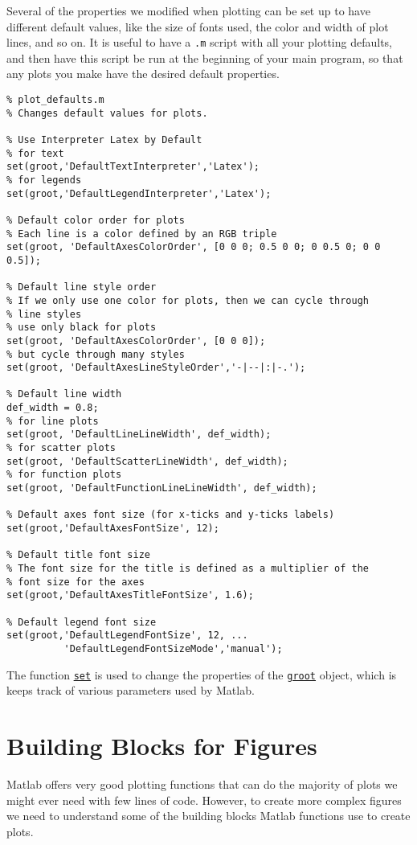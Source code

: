 \documentclass[12pt, a4paper]{article}
\begin{document}
Several of the properties we modified when plotting can be set up to have different default values, like the size of fonts used, the color and width of plot lines, and so on.
It is useful to have a \texttt{.m} script with all your plotting defaults, and then have this script be run at the beginning of your main program, so that any plots you make have the desired default properties.

\lstset{language=matlab,label= ,caption= ,captionpos=b,firstnumber=1,numbers=left,style=Matlab-editor}
\begin{lstlisting}
% plot_defaults.m
% Changes default values for plots.

% Use Interpreter Latex by Default
% for text
set(groot,'DefaultTextInterpreter','Latex');
% for legends
set(groot,'DefaultLegendInterpreter','Latex');

% Default color order for plots
% Each line is a color defined by an RGB triple
set(groot, 'DefaultAxesColorOrder', [0 0 0; 0.5 0 0; 0 0.5 0; 0 0 0.5]);

% Default line style order
% If we only use one color for plots, then we can cycle through
% line styles
% use only black for plots
set(groot, 'DefaultAxesColorOrder', [0 0 0]);
% but cycle through many styles
set(groot, 'DefaultAxesLineStyleOrder','-|--|:|-.');

% Default line width
def_width = 0.8;
% for line plots
set(groot, 'DefaultLineLineWidth', def_width);
% for scatter plots
set(groot, 'DefaultScatterLineWidth', def_width);
% for function plots
set(groot, 'DefaultFunctionLineLineWidth', def_width);

% Default axes font size (for x-ticks and y-ticks labels)
set(groot,'DefaultAxesFontSize', 12);

% Default title font size
% The font size for the title is defined as a multiplier of the
% font size for the axes
set(groot,'DefaultAxesTitleFontSize', 1.6);

% Default legend font size
set(groot,'DefaultLegendFontSize', 12, ...
          'DefaultLegendFontSizeMode','manual');
\end{lstlisting}
The function \href{https://www.mathworks.com/help/matlab/ref/set.html?s\_tid=doc\_ta}{\texttt{set}} is used to change the properties of the \href{https://www.mathworks.com/help/matlab/ref/groot.html?s\_tid=doc\_ta}{\texttt{groot}} object, which is keeps track of various parameters used by Matlab.
\section{Building Blocks for Figures}
\label{sec:org5193f78}
Matlab offers very good plotting functions that can do the majority of plots we might ever need with few lines of code.
However, to create more complex figures we need to understand some of the building blocks Matlab functions use to create plots.
\end{document}
